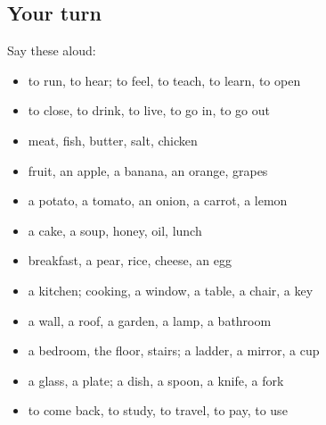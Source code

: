 \subsection*{Your turn}
Say these aloud:

\begin{itemize}
\raggedright
  \item to run, to hear; to feel, to teach, to learn, to open
  \item to close, to drink, to live, to go in, to go out
  \item meat, fish, butter, salt, chicken
  \item fruit, an apple, a banana, an orange, grapes
  \item a potato, a tomato, an onion, a carrot, a lemon
  \item a cake, a soup, honey, oil, lunch
  \item breakfast, a pear, rice, cheese, an egg
  \item a kitchen; cooking, a window, a table, a chair, a key
  \item a wall, a roof, a garden, a lamp, a bathroom
  \item a bedroom, the floor, stairs; a ladder, a mirror, a cup
  \item a glass, a plate; a dish, a spoon, a knife, a fork
  \item to come back, to study, to travel, to pay, to use
\end{itemize}

